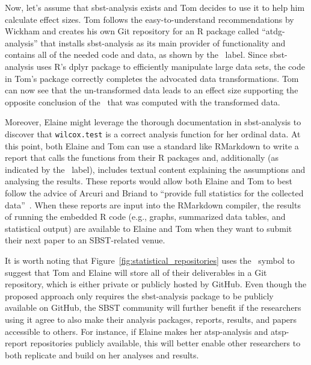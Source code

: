 Now, let's assume that sbst-analysis exists and Tom decides to use it to help him calculate effect sizes. Tom follows
the easy-to-understand recommendations by Wickham and creates his own Git repository for an R package called
``atdg-analysis'' that installs sbst-analysis as its main provider of functionality and contains all of the needed code
and data, as shown by the \codedatagit~label. Since sbst-analysis uses R's dplyr package to efficiently manipulate large
data sets, the code in Tom's package correctly completes the advocated data transformations.  Tom can now see that the
un-transformed data leads to an effect size supporting the opposite conclusion of the \atwelve~that was computed with
the transformed data.


Moreover, Elaine might leverage the thorough documentation in sbst-analysis to discover that {\tt wilcox.test} is a
correct analysis function for her ordinal data. At this point, both Elaine and Tom can use a standard like RMarkdown to
write a report that calls the functions from their R packages and, additionally (as indicated by the
\codeeditgit~label), includes textual content explaining the assumptions and analysing the results. These reports would
allow both Elaine and Tom to best follow the advice of Arcuri and Briand to ``provide full statistics for the collected
data''~\cite{Arcuri2014}. When these reports are input into the RMarkdown compiler, the results of running the
embedded R code (e.g., graphs, summarized data tables, and statistical output) are available to Elaine and Tom when they
want to submit their next paper to an SBST-related venue.

It is worth noting that Figure~\ref{fig:statistical_repositories} uses the \faGit~symbol to suggest that Tom and Elaine
will store all of their deliverables in a Git repository, which is either private or publicly hosted by GitHub. Even though
the proposed approach only requires the sbst-analysis package to be publicly available on GitHub, the SBST community will further
benefit if the researchers using it agree to also make their analysis packages, reports, results, and papers accessible
to others. For instance, if Elaine makes her atsp-analysis and atsp-report repositories publicly available, this will
better enable other researchers to both replicate and build on her analyses and results.
